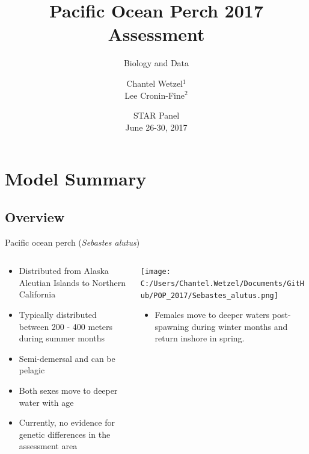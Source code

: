 \documentclass[pdf]{beamer}\usepackage[]{graphicx}\usepackage[]{color}
\title{Pacific Ocean Perch 2017 Assessment}
\subtitle{Biology and Data}
\author{Chantel Wetzel$^{1}$\\
        Lee Cronin-Fine$^{2}$}
\institute[NWFSC]{
Northwest Fisheries Science Center$^1$ \\
University of Washington$^2$ \\
\medskip
}
\date{{\footnotesize STAR Panel \\ June 26-30, 2017}}
\begin{document}
\begin{frame}
  \titlepage
\end{frame}


\section{Model Summary}
\subsection{Overview}
\begin{frame}{Pacific ocean perch (\textit{Sebastes alutus})}
\begin{columns}
  \begin{column}{0.5\textwidth}
      \begin{itemize}
        \item Distributed from  Alaska Aleutian Islands to Northern California
        \item Typically distributed between 200 - 400 meters during summer months
        \item Semi-demersal and can be pelagic
        \item Both sexes move to deeper water with age
        \item Currently, no evidence for genetic differences in the assessment area
      \end{itemize}
  \end{column}
  
  \begin{column}{0.5\textwidth}
    \texttt{[image: C:/Users/Chantel.Wetzel/Documents/GitHub/POP\_2017/Sebastes\_alutus.png]}
    \begin{itemize}
        \item Females move to deeper waters post-spawning during winter months and return inshore in spring.
      \end{itemize}
  \end{column}
\end{columns}
\end{frame}

\end{document}
